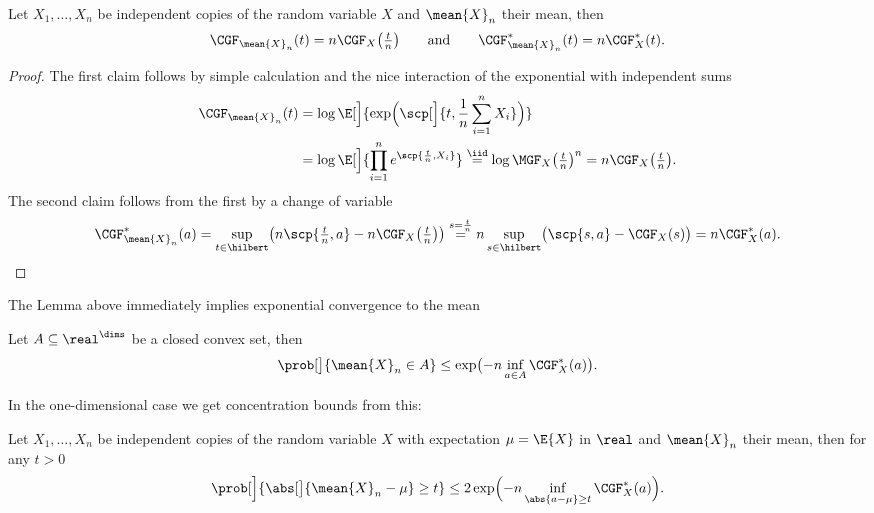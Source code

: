 \begin{lemma}
    Let \(X_1, \ldots, X_n\) be independent copies of the random variable \(X\)
    and \(\mean{X}_n\) their mean, then
    \begin{equation}
        \label{eq: cumulant generating function of the mean}
        \CGF_{\mean{X}_n}(t) = n \CGF_X\bigl(\tfrac{t}n\bigr)
        \qquad\text{and}\qquad
        \CGF_{\mean{X}_n}^*(t) = n \CGF_X^*(t).
    \end{equation}
\end{lemma}
\begin{proof}
    The first claim follows by simple calculation and the nice interaction of
    the exponential with independent sums
    \[\begin{aligned}
        \CGF_{\mean{X}_n}(t)
        &= \log \E[\Big]{\exp\Bigl(\scp[\Big]{t, \frac1n \sum_{i=1}^n X_i}\Bigr)}
        \\
        &= \log \E[\Big]{\prod_{i=1}^n e^{\scp{\frac{t}n, X_i}}}
        \overset{\iid}= \log \MGF_X\bigl(\tfrac{t}n\bigr)^n
        = n \CGF_X\bigl(\tfrac{t}n\bigr).
    \end{aligned}
    \]
    The second claim follows from the first by a change of variable
    \[
        \CGF_{\mean{X}_n}^*(a)
        = \sup_{t\in \hilbert} \bigl(n \scp{\tfrac{t}n, a} - n \CGF_X\bigl(\tfrac{t}n\bigr)\bigr)
        \overset{s=\frac{t}n}= n \sup_{s\in \hilbert} \bigl(\scp{s, a} - \CGF_X(s)\bigr)
        = n \CGF_X^*(a).
        \qedhere
    \]
\end{proof}

The Lemma above immediately implies exponential convergence to the mean
\begin{mdframed}[innertopmargin=0pt]
\begin{corollary}
    Let \(A\subseteq \real^\dims\) be a closed convex set, then
    \[
        \prob[\big]{\mean{X}_n \in A} \le \exp\bigl(-n \inf_{a\in A} \CGF_X^*(a)\bigr).
    \]
\end{corollary}
\end{mdframed}
In the one-dimensional case we get concentration bounds from this:
\begin{mdframed}[innertopmargin=0pt]
\begin{theorem}
    Let \(X_1, \ldots, X_n\) be independent copies of the random variable \(X\)
    with expectation \(\mu=\E{X}\) in \(\real\) and \(\mean{X}_n\) their mean,
    then for any \(t > 0\)
    \[
        \prob[\Big]{\abs[\big]{\mean{X}_n - \mu} \ge t} \le 2 \exp\Bigl(-n \inf_{\abs{a-\mu}\ge t} \CGF_X^*(a)\Bigr).
    \]
\end{theorem}
\end{mdframed}

